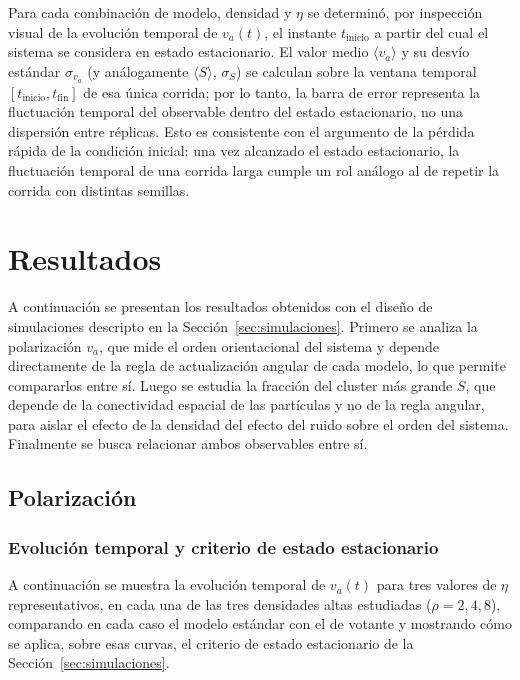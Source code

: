 \documentclass[11pt,a4paper]{article}
\begin{document}
Para cada combinación de modelo, densidad y $\eta$ se determinó, por
inspección visual de la evolución temporal de $v_a(t)$, el instante
$t_{\text{inicio}}$ a partir del cual el sistema se considera en estado
estacionario. El valor medio $\langle v_a \rangle$ y su desvío estándar
$\sigma_{v_a}$ (y análogamente $\langle S \rangle$, $\sigma_S$) se calculan
sobre la ventana temporal $[t_{\text{inicio}}, t_{\text{fin}}]$ de esa única
corrida; por lo tanto, la barra de error representa la fluctuación temporal
del observable dentro del estado estacionario, no una dispersión entre
réplicas. Esto es consistente con el argumento de la pérdida rápida de la
condición inicial: una vez alcanzado el estado estacionario, la fluctuación
temporal de una corrida larga cumple un rol análogo al de repetir la
corrida con distintas semillas.

\section{Resultados}
\label{sec:resultados}

A continuación se presentan los resultados obtenidos con el diseño de
simulaciones descripto en la Sección~\ref{sec:simulaciones}. Primero se
analiza la polarización $v_a$, que mide el orden orientacional del sistema
y depende directamente de la regla de actualización angular de cada modelo,
lo que permite compararlos entre sí. Luego se estudia la fracción del
cluster más grande $S$, que depende de la conectividad espacial de las
partículas y no de la regla angular, para aislar el efecto de la densidad
del efecto del ruido sobre el orden del sistema. Finalmente se busca
relacionar ambos observables entre sí.

\subsection{Polarización}

\subsubsection{Evolución temporal y criterio de estado estacionario}

A continuación se muestra la evolución temporal de $v_a(t)$ para tres
valores de $\eta$ representativos, en cada una de las tres densidades
altas estudiadas ($\rho = 2, 4, 8$), comparando en cada caso el modelo
estándar con el de votante y mostrando cómo se aplica, sobre esas curvas,
el criterio de estado estacionario de la Sección~\ref{sec:simulaciones}.
\end{document}
